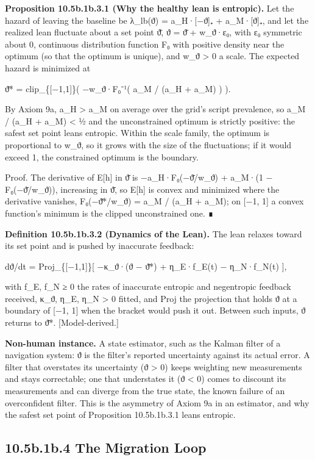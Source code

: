 \documentclass[
]{article}
\begin{document}
\textbf{Proposition 10.5b.1b.3.1 (Why the healthy lean is entropic).}
Let the hazard of leaving the baseline be λ\_lb(ϑ) = a\_H·{[}−ϑ{]}₊ +
a\_M·{[}ϑ{]}₊, and let the realized lean fluctuate about a set point ϑ̄,
ϑ = ϑ̄ + w\_ϑ·ε₀, with ε₀ symmetric about 0, continuous distribution
function F₀ with positive density near the optimum (so that the optimum
is unique), and w\_ϑ \textgreater{} 0 a scale. The expected hazard is
minimized at

ϑ̄* = clip\_\{{[}−1,1{]}\}( −w\_ϑ·F₀⁻¹( a\_M / (a\_H + a\_M) ) ).

By Axiom 9a, a\_H \textgreater{} a\_M on average over the grid's script
prevalence, so a\_M / (a\_H + a\_M) \textless{} ½ and the unconstrained
optimum is strictly positive: the safest set point leans entropic.
Within the scale family, the optimum is proportional to w\_ϑ, so it
grows with the size of the fluctuations; if it would exceed 1, the
constrained optimum is the boundary.

Proof. The derivative of E{[}h{]} in ϑ̄ is −a\_H·F₀(−ϑ̄/w\_ϑ) + a\_M·(1 −
F₀(−ϑ̄/w\_ϑ)), increasing in ϑ̄, so E{[}h{]} is convex and minimized where
the derivative vanishes, F₀(−ϑ̄*/w\_ϑ) = a\_M / (a\_H + a\_M); on {[}−1,
1{]} a convex function's minimum is the clipped unconstrained one. ∎

\textbf{Definition 10.5b.1b.3.2 (Dynamics of the Lean).} The lean
relaxes toward its set point and is pushed by inaccurate feedback:

dϑ/dt = Proj\_\{{[}−1,1{]}\}{[} −κ\_ϑ·(ϑ − ϑ̄*) + η\_E·f\_E(t) −
η\_N·f\_N(t) {]},

with f\_E, f\_N ≥ 0 the rates of inaccurate entropic and negentropic
feedback received, κ\_ϑ, η\_E, η\_N \textgreater{} 0 fitted, and Proj
the projection that holds ϑ at a boundary of {[}−1, 1{]} when the
bracket would push it out. Between such inputs, ϑ returns to ϑ̄*.
{[}Model-derived.{]}

\textbf{Non-human instance.} A state estimator, such as the Kalman
filter of a navigation system: ϑ is the filter's reported uncertainty
against its actual error. A filter that overstates its uncertainty (ϑ
\textgreater{} 0) keeps weighting new measurements and stays
correctable; one that understates it (ϑ \textless{} 0) comes to discount
its measurements and can diverge from the true state, the known failure
of an overconfident filter. This is the asymmetry of Axiom 9a in an
estimator, and why the safest set point of Proposition 10.5b.1b.3.1
leans entropic.

\hypertarget{b.1b.4-the-migration-loop}{%
\subsection{10.5b.1b.4 The Migration
Loop}\label{b.1b.4-the-migration-loop}}
\end{document}
